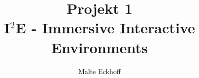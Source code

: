 \documentclass[twocolumn]{article}
\title{Projekt 1\\I$^2$E - Immersive Interactive Environments}
\author{Malte Eckhoff}
\begin{document}
	\onecolumn
	\maketitle
	\newpage
	
	\tableofcontents
	\newpage
	
	\twocolumn
	
	
	
	
	
	
	
	
	
	\onecolumn
	\newpage	
	{}
	
\end{document}
